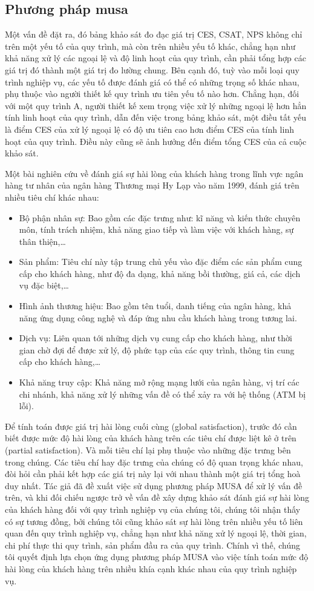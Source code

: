 \subsection{Phương pháp \acrshort*{musa}}
Một vấn đề đặt ra, đó bảng khảo sát đo đạc giá trị CES, CSAT, NPS không chỉ trên một yếu tố của quy trình, mà còn trên nhiều yếu tố khác, chẳng hạn như khả năng xử lý các ngoại lệ và độ linh hoạt của quy trình, cần phải tổng hợp các giá trị đó thành một giá trị đo lường chung. Bên cạnh đó, tuỳ vào mỗi loại quy trình nghiệp vụ, các yếu tố được đánh giá có thể có những trọng số khác nhau, phụ thuộc vào người thiết kế quy trình ưu tiên yếu tố nào hơn. Chẳng hạn, đối với một quy trình A, người thiết kế xem trọng việc xử lý những ngoại lệ hơn hẳn tính linh hoạt của quy trình, dẫn đến việc trong bảng khảo sát, một điều tất yếu là điểm CES của xử lý ngoại lệ có độ ưu tiên cao hơn điểm CES của tính linh hoạt của quy trình. Điều này cũng sẽ ảnh hưởng đến điểm tổng CES của cả cuộc khảo sát.
\par
Một bài nghiên cứu về đánh giá sự hài lòng của khách hàng trong lĩnh vực ngân hàng tư nhân của ngân hàng Thương mại Hy Lạp vào năm 1999, đánh giá trên nhiều tiêu chí khác nhau:
\begin{itemize}
    \item Bộ phận nhân sự: Bao gồm các đặc trưng như: kĩ năng và kiến thức chuyên môn, tính trách nhiệm, khả năng giao tiếp và làm việc với khách hàng, sự thân thiện,…
    \item Sản phẩm: Tiêu chí này tập trung chủ yếu vào đặc điểm các sản phẩm cung cấp cho khách hàng, như độ đa dạng, khả năng bồi thường, giá cả, các dịch vụ đặc biệt,…
    \item Hình ảnh thương hiệu: Bao gồm tên tuổi, danh tiếng của ngân hàng, khả năng ứng dụng công nghệ và đáp ứng nhu cầu khách hàng trong tương lai.
    \item Dịch vụ: Liên quan tới những dịch vụ cung cấp cho khách hàng, như thời gian chờ đợi để được xử lý, độ phức tạp của các quy trình, thông tin cung cấp cho khách hàng,…
    \item Khả năng truy cập: Khả năng mở rộng mạng lưới của ngân hàng, vị trí các chi nhánh, khả năng xử lý những vấn đề có thể xảy ra với hệ thống (ATM bị lỗi).
\end{itemize}
Để tính toán được giá trị hài lòng cuối cùng (global satisfaction), trước đó cần biết được mức độ hài lòng của khách hàng trên các tiêu chí được liệt kê ở trên (partial satisfaction). Và mỗi tiêu chí lại phụ thuộc vào những đặc trưng bên trong chúng. Các tiêu chí hay đặc trưng của chúng có độ quan trọng khác nhau, đòi hỏi cần phải kết hợp các giá trị này lại với nhau thành một giá trị tổng hoà duy nhất. Tác giả đã đề xuất việc sử dụng phương pháp MUSA để xử lý vấn đề trên, và khi đối chiếu ngược trở về vấn đề xây dựng khảo sát đánh giá sự hài lòng của khách hàng đối với quy trình nghiệp vụ của chúng tôi, chúng tôi nhận thấy có sự tương đồng, bởi chúng tôi cũng khảo sát sự hài lòng trên nhiều yếu tố liên quan đến quy trình nghiệp vụ, chẳng hạn như khả năng xử lý ngoại lệ, thời gian, chi phí thực thi quy trình, sản phẩm đầu ra của quy trình. Chính vì thế, chúng tôi quyết định lựa chọn ứng dụng phương pháp MUSA vào việc tính toán mức độ hài lòng của khách hàng trên nhiều khía cạnh khác nhau của quy trình nghiệp vụ. 

